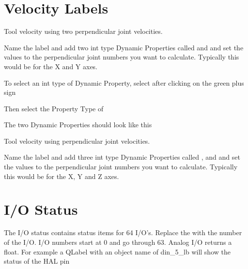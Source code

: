 \documentclass[letterpaper,10pt,english]{sphinxmanual}
\begin{document}
\section{Velocity Labels}
\label{\detokenize{labels:velocity-labels}}
\sphinxAtStartPar
Tool velocity using two perpendicular joint velocities.

\sphinxAtStartPar
Name the label  and add two int type Dynamic Properties called
 and  and set the values to the perpendicular joint numbers
you want to calculate. Typically this would be for the X and Y axes.

\sphinxAtStartPar
To select an int type of Dynamic Property, select  after clicking on
the green plus sign


\sphinxAtStartPar
Then select the Property Type of 


\sphinxAtStartPar
The two Dynamic Properties should look like this


\sphinxAtStartPar
Tool velocity using  perpendicular joint velocities.

\sphinxAtStartPar
Name the label  and add three int type Dynamic Properties called
,  and  and set the values to the perpendicular
joint numbers you want to calculate. Typically this would be for the X, Y and
Z axes.


\section{I/O Status}
\label{\detokenize{labels:i-o-status}}
\sphinxAtStartPar
The I/O status contains status items for 64 I/O’s. Replace the  with the
number of the I/O. I/O numbers start at 0 and go through 63. Analog I/O
returns a float. For example a QLabel with an object name of din\_5\_lb will
show the status of the  HAL pin
\end{document}
